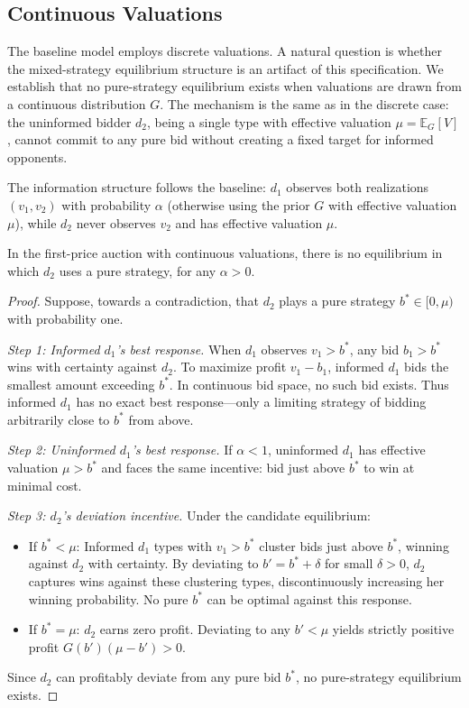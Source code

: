 \subsection{Continuous Valuations}\label{sect:continuous-values}

The baseline model employs discrete valuations. A natural question is whether the mixed-strategy equilibrium structure is an artifact of this specification. We establish that no pure-strategy equilibrium exists when valuations are drawn from a continuous distribution $G$. The mechanism is the same as in the discrete case: the uninformed bidder $d_2$, being a single type with effective valuation $\mu = \mathbb{E}_G[V]$, cannot commit to any pure bid without creating a fixed target for informed opponents.

\noindent The information structure follows the baseline: $d_1$ observes both realizations $(v_1, v_2)$ with probability $\alpha$ (otherwise using the prior $G$ with effective valuation $\mu$), while $d_2$ never observes $v_2$ and has effective valuation $\mu$.

\begin{prop}
In the first-price auction with continuous valuations, there is no equilibrium in which $d_2$ uses a pure strategy, for any $\alpha > 0$.
\end{prop}

\begin{proof}
Suppose, towards a contradiction, that $d_2$ plays a pure strategy $b^* \in [0, \mu)$ with probability one.

\medskip
\noindent\textit{Step 1: Informed $d_1$'s best response.} When $d_1$ observes $v_1 > b^*$, any bid $b_1 > b^*$ wins with certainty against $d_2$. To maximize profit $v_1 - b_1$, informed $d_1$ bids the smallest amount exceeding $b^*$. In continuous bid space, no such bid exists. Thus informed $d_1$ has no exact best response—only a limiting strategy of bidding arbitrarily close to $b^*$ from above.

\medskip
\noindent\textit{Step 2: Uninformed $d_1$'s best response.} If $\alpha < 1$, uninformed $d_1$ has effective valuation $\mu > b^*$ and faces the same incentive: bid just above $b^*$ to win at minimal cost.

\medskip
\noindent\textit{Step 3: $d_2$'s deviation incentive.} Under the candidate equilibrium:
\begin{itemize}
    \item If $b^* < \mu$: Informed $d_1$ types with $v_1 > b^*$ cluster bids just above $b^*$, winning against $d_2$ with certainty. By deviating to $b' = b^* + \delta$ for small $\delta > 0$, $d_2$ captures wins against these clustering types, discontinuously increasing her winning probability. No pure $b^*$ can be optimal against this response.
    \item If $b^* = \mu$: $d_2$ earns zero profit. Deviating to any $b' < \mu$ yields strictly positive profit $G(b')(\mu - b') > 0$.
\end{itemize}
Since $d_2$ can profitably deviate from any pure bid $b^*$, no pure-strategy equilibrium exists.
\end{proof}

